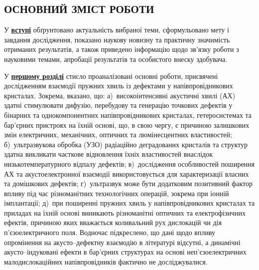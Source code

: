 

\begin{center}
\section*{\MakeUppercase{ОСНОВНИЙ ЗМІСТ РОБОТИ}}
\end{center}

У  \underline{\textbf{вступі}}  обґрунтовано актуальність  вибраної  теми, сформульовано  мету  і
завдання  дослідження, показано  наукову  новизну  та практичну  значимість
отриманих результатів, а також приведено інформацію щодо зв’язку роботи з науковими темами, апробації результатів та
особистого внеску здобувача.


У  \underline{\textbf{першому розділі}}   стисло проаналізовані основні роботи, присвячені
дослідженням взаємодії пружних хвиль із дефектами у напівпровідникових кристалах.
Зокрема,
вказано, що:
а)~високоінтенсивні акустичні хвилі (АХ) здатні стимулювати дифузію, перебудову та генерацію точкових дефектів у бінарних та однокомпонентних напівпровідникових кристалах, гетеросистемах та бар'єрних пристроях на їхній основі,
що, в свою чергу, є причиною залишкових змін електричних, механічних, оптичних та  люмінесцентних властивостей;
б)~ультразвукова обробка (УЗО) радіаційно деградованих кристалів та структур здатна викликати часткове відновлення їхніх властивостей внаслідок низькотемпературного відпалу дефектів;
в)~дослідження особливостей поширення АХ та акустоелектронної взаємодії використовується для характеризації власних та домішкових дефектів;
г)~ультразвук може бути додатковим позитивний фактор впливу під час різноманітних технологічних операцій, зокрема при іонній імплантації;
д)~при поширенні пружних хвиль у напівпровідникових кристалах та приладах на їхній основі виникають різноманітні оптичних та електрофізичних ефектів, причиною яких вважається коливальний рух дислокацій чи дія п'єзоелектричного поля.
Водночас підкреслено,
що дані щодо впливу опромінення на акусто--дефектну взаємодію в літературі відсутні,
а динамічні акусто--індуковані ефекти в бар'єрних структурах на основі неп'єзоелектричних малодислокаційних напівпровідників фактично не досліджувалися.

